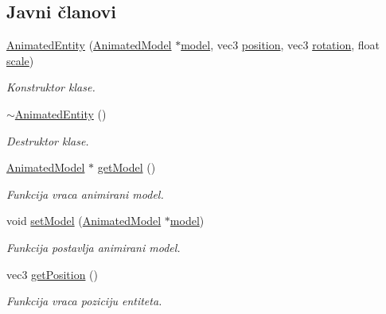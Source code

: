 \subsection*{Javni članovi}
\begin{DoxyCompactItemize}
\item 
\hyperlink{classentity_1_1AnimatedEntity_a5b237ce1eaf0be4ea8d769ee94ea65b2}{Animated\+Entity} (\hyperlink{classmodel_1_1AnimatedModel}{Animated\+Model} $\ast$\hyperlink{classentity_1_1AnimatedEntity_a1f9e73e14bf1588ed9e7c9e7f7d4aab3}{model}, vec3 \hyperlink{classentity_1_1AnimatedEntity_ab02891959f4c1191807e267c48466230}{position}, vec3 \hyperlink{classentity_1_1AnimatedEntity_a32f7718856950b74d40f4a96c1aa6f3d}{rotation}, float \hyperlink{classentity_1_1AnimatedEntity_a137e8fe0398142e9dedebb3eb1fe4f2f}{scale})
\begin{DoxyCompactList}\small\item\em Konstruktor klase. \end{DoxyCompactList}\item 
\hyperlink{classentity_1_1AnimatedEntity_a086eb2e6c8d1765ffd675b51293ed85b}{$\sim$\+Animated\+Entity} ()
\begin{DoxyCompactList}\small\item\em Destruktor klase. \end{DoxyCompactList}\item 
\hyperlink{classmodel_1_1AnimatedModel}{Animated\+Model} $\ast$ \hyperlink{classentity_1_1AnimatedEntity_ace7e7879a67cd75dac8cd867e79dd744}{get\+Model} ()
\begin{DoxyCompactList}\small\item\em Funkcija vraca animirani model. \end{DoxyCompactList}\item 
void \hyperlink{classentity_1_1AnimatedEntity_ae4948cd74084f403db1e660e5815cad6}{set\+Model} (\hyperlink{classmodel_1_1AnimatedModel}{Animated\+Model} $\ast$\hyperlink{classentity_1_1AnimatedEntity_a1f9e73e14bf1588ed9e7c9e7f7d4aab3}{model})
\begin{DoxyCompactList}\small\item\em Funkcija postavlja animirani model. \end{DoxyCompactList}\item 
vec3 \hyperlink{classentity_1_1AnimatedEntity_adc612d974f4cb04142edc2a4dbe7c3fa}{get\+Position} ()
\begin{DoxyCompactList}\small\item\em Funkcija vraca poziciju entiteta. \end{DoxyCompactList}\item 

\end{DoxyCompactItemize}
